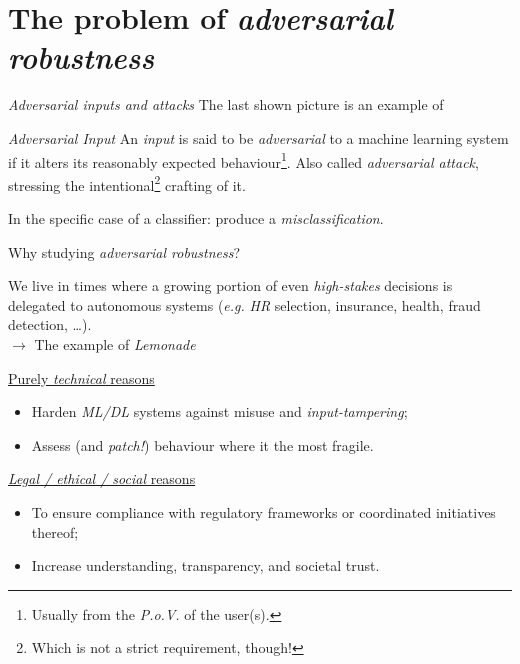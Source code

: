 
\section{ The problem of \textit{adversarial robustness}}{

    \begin{frame}{ \textit{Adversarial inputs and attacks}}
        The last shown picture is an example of
        \hfill\break
        \begin{block}{\textit{Adversarial Input}}
            An \textit{input} is said to be \textit{adversarial} to a machine learning system if it alters its \alert{reasonably} expected behaviour\footnote{Usually from the \textit{P.o.V.} of the user(s).}. Also called \textit{adversarial attack}, stressing the intentional\footnote{Which is not a strict requirement, though!} crafting of it.
        \end{block}

    In the specific case of a classifier: produce a \textit{misclassification}.
    \end{frame}


    \begin{frame}{ Why studying \textit{adversarial robustness}?}

        We live in times where a growing portion of even \textit{high-stakes} \alert{decisions} is \alert{delegated} to autonomous systems (\textit{e.g.} \textit{HR} selection, insurance, health, fraud detection, \etc\dots).\\$\rightarrow$ The example of \textit{Lemonade} 

        \underline{Purely \textit{technical} reasons}
        \begin{itemize}
            \item Harden \textit{ML/DL} systems against \alert{misuse} and \textit{input-tampering};
            \item Assess (and \textit{\alert{patch}!}) behaviour where it the most fragile.
        \end{itemize}

        \underline{\textit{Legal / ethical / social} reasons}
        \begin{itemize}
            \item To ensure \alert{compliance} with regulatory frameworks or coordinated initiatives thereof;
            \item Increase understanding, transparency, and societal \alert{trust}.
        \end{itemize}


\end{frame}}
